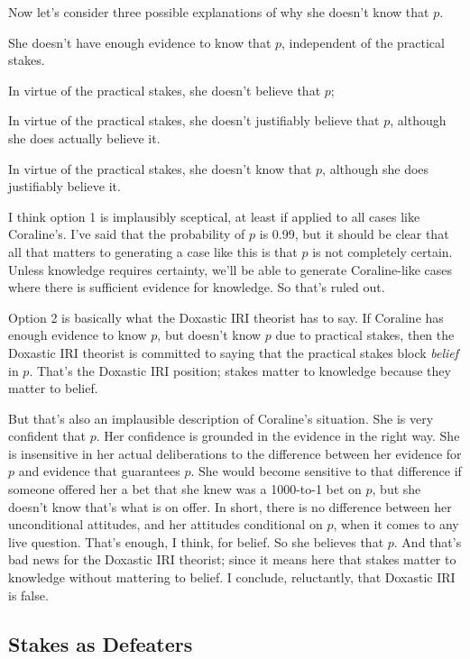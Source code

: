 Now let's consider three possible explanations of why she doesn't know that $p$.

\begin{enumerate*}
\item She doesn't have enough evidence to know that $p$, independent of the practical stakes.
\item In virtue of the practical stakes, she doesn't believe that $p$;
\item In virtue of the practical stakes, she doesn't justifiably believe that $p$, although she does actually believe it.
\item In virtue of the practical stakes, she doesn't know that $p$, although she does justifiably believe it.
\end{enumerate*}

\noindent I think option 1 is implausibly sceptical, at least if applied to all cases like Coraline's. I've said that the probability of $p$ is 0.99, but it should be clear that all that matters to generating a case like this is that $p$ is not completely certain. Unless knowledge requires certainty, we'll be able to generate Coraline-like cases where there is sufficient evidence for knowledge. So that's ruled out.

Option 2 is basically what the Doxastic IRI theorist has to say. If Coraline has enough evidence to know $p$, but doesn't know $p$ due to practical stakes, then the Doxastic IRI theorist is committed to saying that the practical stakes block \textit{belief} in $p$. That's the Doxastic IRI position; stakes matter to knowledge because they matter to belief.

But that's also an implausible description of Coraline's situation. She is very confident that $p$. Her confidence is grounded in the evidence in the right way. She is insensitive in her actual deliberations to the difference between her evidence for $p$ and evidence that guarantees $p$. She would become sensitive to that difference if someone offered her a bet that she knew was a 1000-to-1 bet on $p$, but she doesn't know that's what is on offer. In short, there is no difference between her unconditional attitudes, and her attitudes conditional on $p$, when it comes to any live question. That's enough, I think, for belief. So she believes that $p$. And that's bad news for the Doxastic IRI theorist; since it means here that stakes matter to knowledge without mattering to belief. I conclude, reluctantly, that Doxastic IRI is false.

\subsection{Stakes as Defeaters}

